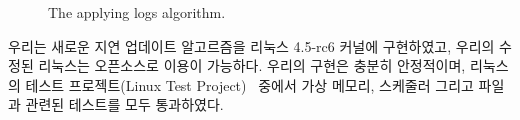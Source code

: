 \begin{figure}[h!]
\begin{center}
\inputminted[linenos,fontsize=\footnotesize,
tabsize=4]{c}{src/ldu_queue_per_core.c}
\end{center}
\caption{The \LDU applying logs algorithm.}
\label{fig:glduphysicalupdate}
\end{figure}





우리는 새로운 지연 업데이트 알고르즘을 리눅스 4.5-rc6 커널에 구현하였고, 우리의 
수정된 리눅스는 오픈소스로 이용이 가능하다. 
우리의 구현은 충분히 안정적이며, 리눅스의 테스트 프로젝트(Linux Test Project)~\cite{LTP}
 중에서 가상 메모리, 스케줄러 그리고 파일과 관련된 테스트를 모두 통과하였다. 
